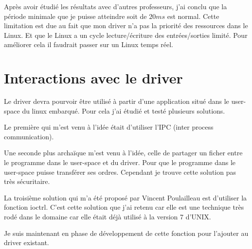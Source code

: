 \vspace{1cm}

Après avoir étudié les résultats avec d'autres professeurs, j'ai conclu que la période minimale que je puisse atteindre soit de $20ms$ est normal. Cette limitation est due au fait que mon driver n'a pas la priorité des ressources dans le Linux. Et que le Linux a un cycle lecture/écriture des entrées/sorties limité. Pour améliorer cela il faudrait passer sur un Linux temps réel.

\section{Interactions avec le driver}

Le driver devra pourvoir être utilisé à partir d'une application situé dans le user-space du linux embarqué. Pour cela j'ai étudié et testé plusieurs solutions.

Le première qui m'est venu à l'idée était d'utiliser l'IPC (inter process communication). 

Une seconde plus archaïque m'est venu à l'idée, celle de partager un ficher entre le programme dans le user-space et du driver. Pour que le programme dans le user-space puisse transférer ses ordres. Cependant je trouve cette solution pas très sécuritaire.

La troisième solution qui m'a été proposé par Vincent Poulailleau est d'utiliser la fonction ioctrl. C'est cette solution que j'ai retenu car elle est une technique très rodé dans le domaine car elle était déjà utilisé à la version 7 d'UNIX. 

\vspace{1cm}

Je suis maintenant en phase de développement de cette fonction pour l'ajouter au driver existant.


